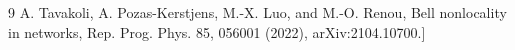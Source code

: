 \begin{thebibliography}{9}
A. Tavakoli, A. Pozas-Kerstjens, M.-X. Luo, and M.-O.
Renou, Bell nonlocality in networks, Rep. Prog. Phys.
85, 056001 (2022), arXiv:2104.10700.]

\end{thebibliography}


